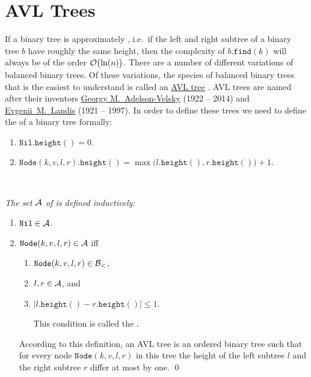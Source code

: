 \section{AVL Trees}
If a binary tree is approximately , i.e.~if the left and right subtree of a binary tree $b$  have
roughly the same height, then the complexity of $b.\texttt{find}(k)$ will always be of the order
$\mathcal{O}\bigl(\ln(n)\bigr)$.  There are a number of different variations of
balanced binary trees.  Of these variations, the species of balanced binary trees that is the easiest to understand is
called an \href{https://en.wikipedia.org/wiki/AVL_tree}{AVL tree} \cite{adelson:62}.  AVL trees are 
named after their inventors \href{https://en.wikipedia.org/wiki/Georgy_Adelson-Velsky}{Georgy M.~Adelson-Velsky} 
(1922 -- 2014) and \href{https://en.wikipedia.org/wiki/Evgenii_Landis}{Evgenii~M.~Landis} (1921 -- 1997).  
In order to define these trees we need to define the  of a binary tree formally:
\begin{enumerate}
\item $\texttt{Nil}.\texttt{height}() = 0$.
\item $\texttt{Node}(k,v,l,r).\texttt{height}() = 
       \max\bigl( l.\texttt{height}(), r.\texttt{height}() \bigr) + 1$. \eox
\end{enumerate}

\begin{Definition} \hspace*{\fill} \\
{\em 
  The set $\mathcal{A}$ of  is defined inductively:
  \begin{enumerate}
  \item $\texttt{Nil} \in \mathcal{A}$.
  \item $\texttt{Node}(k,v,l,r) \in \mathcal{A}$ \quad iff 
        \begin{enumerate}
        \item $\texttt{Node}(k,v,l,r) \in \mathcal{B}_<$,
        \item $l, r \in \mathcal{A}$, \quad and
        \item $|l.\texttt{height}() - r.\texttt{height}()| \leq 1$.

              This condition is called the .
        \end{enumerate}
        According to this definition, an AVL tree is an ordered binary tree such that for every node
        $\texttt{Node}(k,v,l,r)$ in this tree the height of the left subtree $l$ and the right
        subtree  $r$ differ at most by one.  \qed
  \end{enumerate}
}  
\end{Definition}

